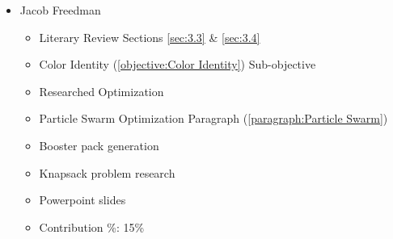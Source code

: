 \documentclass[12pt, letterpaper]{article}
\begin{document}
\begin{itemize}
\begin{itemize}
\end{itemize}

\item Jacob Freedman

\begin{itemize}

    \item Literary Review Sections \ref{sec:3.3} \& \ref{sec:3.4}
    \item Color Identity (\ref{objective:Color Identity}) Sub-objective
    \item Researched Optimization
    \item Particle Swarm Optimization Paragraph (\ref{paragraph:Particle Swarm})
	\item Booster pack generation
	\item Knapsack problem research
	\item Powerpoint slides
    \item Contribution \%: 15\%

\end{itemize}

\end{itemize}
\end{document}
